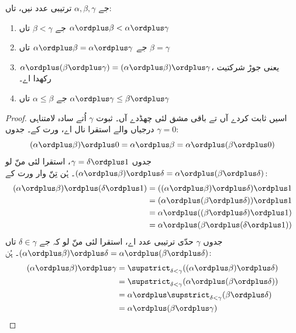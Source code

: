 \documentclass[../../../include/open-logic-section]{subfiles}
\begin{document}
\begin{lem}
جے $\alpha, \beta, \gamma$ ترتیبی عدد نیں، تاں:
\begin{enumerate}
	\item{} جے $\beta < \gamma$ تاں $\alpha
	\ordplus  \beta < \alpha \ordplus  \gamma$
	\item{} جے $\alpha \ordplus  \beta =
	\alpha\ordplus \gamma$ تاں $\beta = \gamma$
	\item{} $\alpha \ordplus  (\beta \ordplus
	\gamma) = (\alpha \ordplus  \beta) \ordplus  \gamma$، یعنی جوڑ شرکتیت رکھدا اے۔
	\item{} جے $\alpha \leq \beta$ تاں $\alpha
	\ordplus  \gamma \leq \beta \ordplus \gamma$
\end{enumerate}
\end{lem}

\begin{proof}
اسیں  ثابت کردے آں تے باقی مشق لئی چھڈدے آں۔ ثبوت $\gamma$ اُتے سادہ لامتناہی درجیاں والے استقرا نال اے،  ورت کے۔ جدوں $\gamma = 0$:
\[
(\alpha \ordplus  \beta) \ordplus  0 = \alpha \ordplus  \beta  = \alpha \ordplus  (\beta \ordplus  0)
\]
جدوں $\gamma = \delta\ordplus 1$، استقرا لئی منّ لو $(\alpha
\ordplus  \beta) \ordplus  \delta = \alpha \ordplus  (\beta \ordplus
\delta)$۔ ہُن  تِنّ وار ورت کے:
\begin{align*}
	(\alpha \ordplus  \beta) \ordplus  (\delta \ordplus  1) & = ((\alpha \ordplus  \beta) \ordplus  \delta)\ordplus 1\\
	& = (\alpha \ordplus  (\beta \ordplus  \delta)) \ordplus  1\\
	& = \alpha \ordplus  ((\beta \ordplus  \delta)\ordplus 1)\\
	& = \alpha \ordplus  (\beta \ordplus  (\delta\ordplus 1))
\end{align*}
جدوں $\gamma$ حدّی ترتیبی عدد اے، استقرا لئی منّ لو کہ جے $\delta \in \gamma$ تاں $(\alpha \ordplus  \beta) \ordplus  \delta =
\alpha \ordplus  (\beta \ordplus  \delta)$۔ ہُن:
\begin{align*}
	(\alpha \ordplus  \beta) \ordplus  \gamma & = \supstrict_{\delta < \gamma}((\alpha \ordplus  \beta) \ordplus  \delta) \\
	&= \supstrict_{\delta < \gamma}(\alpha \ordplus  (\beta \ordplus  \delta))\\
	&= \alpha \ordplus  \supstrict_{\delta < \gamma}(\beta \ordplus  \delta)\\
	& = \alpha \ordplus  (\beta \ordplus  \gamma)
\end{align*}
\end{proof}
\end{document}
